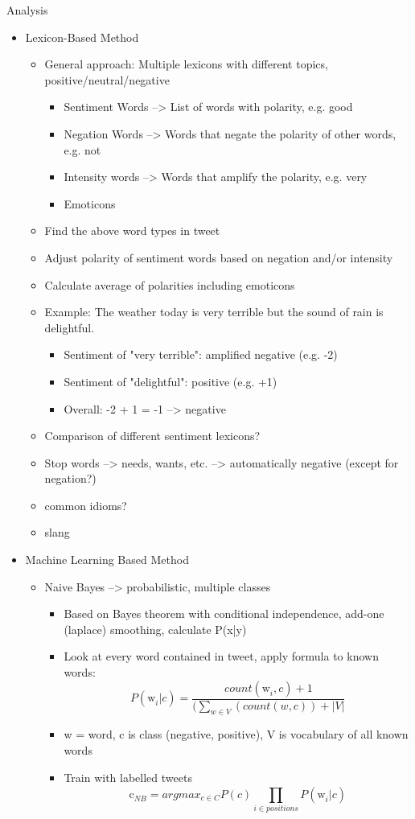 Analysis
\begin{itemize}
    \item Lexicon-Based Method
    \begin{itemize}
    \item General approach: Multiple lexicons with different topics, positive/neutral/negative
    \begin{itemize}
        \item Sentiment Words --> List of words with polarity, e.g. good
        \item Negation Words --> Words that negate the polarity of other words, e.g. not
        \item Intensity words --> Words that amplify the polarity, e.g. very
        \item Emoticons
    \end{itemize}
    \item Find the above word types in tweet
    \item Adjust polarity of sentiment words based on negation and/or intensity
    \item Calculate average of polarities including emoticons
    \item Example: The weather today is very terrible but the sound of rain is delightful.
    \begin{itemize}
        \item Sentiment of "very terrible": amplified negative (e.g. -2)
        \item Sentiment of "delightful": positive (e.g. +1)
        \item Overall: -2 + 1 = -1 --> negative
    \end{itemize}
    \item Comparison of different sentiment lexicons?
    \item Stop words --> needs, wants, etc. --> automatically negative (except for negation?)
    \item common idioms?
    \item slang
    \end{itemize}
    \item Machine Learning Based Method
    \begin{itemize}
        \item Naive Bayes --> probabilistic, multiple classes
        \begin{itemize}
            \item Based on Bayes theorem with conditional independence, add-one (laplace) smoothing, calculate P(x|y)
            \item Look at every word contained in tweet, apply formula to known words:
\[P(\mathrm{w}_{i}^{}|c) = \frac{count(\mathrm{w}_{i}^{}, c)+1}{(\sum_{w\in V}^{} (count(w,c)) + \left| V \right|} \]
            \item w = word, c is class (negative, positive), V is vocabulary of all known words
            \item Train with labelled tweets
           \[ \mathrm{c}_{NB}^{} = argmax_{c \in C}  P(c) \prod_{i \in positions}^{} P(\mathrm{w}_{i}^{}|c)\]
          

\end{itemize}
\end{itemize}
\end{itemize}
